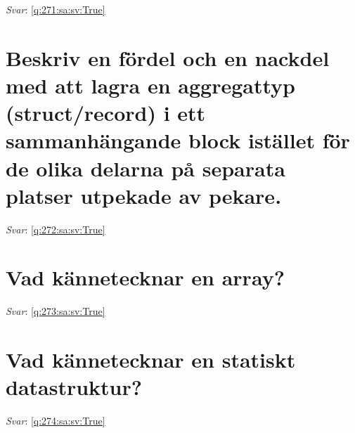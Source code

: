 \documentclass[a4paper,11pt,oneside]{book}
\begin{document}
\begin{sloppypar}
\vspace{2cm}

\noindent\makebox[\textwidth]{\hrulefill}

\vspace{1cm}

\textit{Svar}: \autoref{q:271:sa:sv:True}



\section{Beskriv en f\"ordel och en nackdel med att lagra en aggregattyp (struct/record) i ett sammanh\"angande block ist\"allet f\"or de olika delarna p\r{a} separata platser utpekade av pekare.}

\label{q:272:sa:sv:False}

\vspace{2cm}

\noindent\makebox[\textwidth]{\hrulefill}

\vspace{1cm}

\textit{Svar}: \autoref{q:272:sa:sv:True}



\section{Vad k\"annetecknar en array?}

\label{q:273:sa:sv:False}

\vspace{2cm}

\noindent\makebox[\textwidth]{\hrulefill}

\vspace{1cm}

\textit{Svar}: \autoref{q:273:sa:sv:True}



\section{Vad k\"annetecknar en statiskt datastruktur?}

\label{q:274:sa:sv:False}

\vspace{2cm}

\noindent\makebox[\textwidth]{\hrulefill}

\vspace{1cm}

\textit{Svar}: \autoref{q:274:sa:sv:True}




\end{sloppypar}
\end{document}
